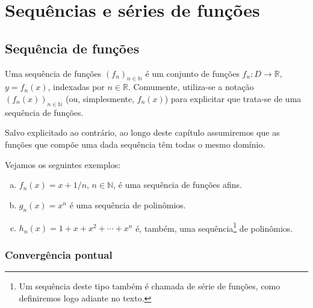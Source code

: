 
\chapter{Sequências e séries de funções}\label{cap_ssfuncoes}
\thispagestyle{fancy}

\section{Sequência de funções}\label{cap_ssfuncoes_sec_sf}

\begin{defn}
  Uma sequência de funções $(f_n)_{n\in\mathbb{N}}$ é um conjunto de funções $f_n:D\to\mathbb{R}$, $y=f_n(x)$, indexadas por $n\in\mathbb{R}$. Comumente, utiliza-se a notação $(f_n(x))_{n\in\mathbb{N}}$ (ou, simplesmente, $f_n(x)$) para explicitar que trata-se de uma sequência de funções.
\end{defn}

\begin{obs}
  Salvo explicitado ao contrário, ao longo deste capítulo assumiremos que as funções que compõe uma dada sequência têm todas o mesmo domínio.
\end{obs}

\begin{ex}
  Vejamos os seguintes exemplos:
  \begin{enumerate}[a)]
  \item $f_n(x) = x+1/n$, $n\in\mathbb{N}$, é uma sequência de funções afins.
  \item $g_n(x) = x^n$ é uma sequência de polinômios.
  \item $h_n(x) = 1 + x + x^2 + \cdots + x^n$ é, também, uma sequência\footnote{Um sequência deste tipo também é chamada de série de funções, como definiremos logo adiante no texto.} de polinômios.
  \end{enumerate}
\end{ex}

\subsection{Convergência pontual}

